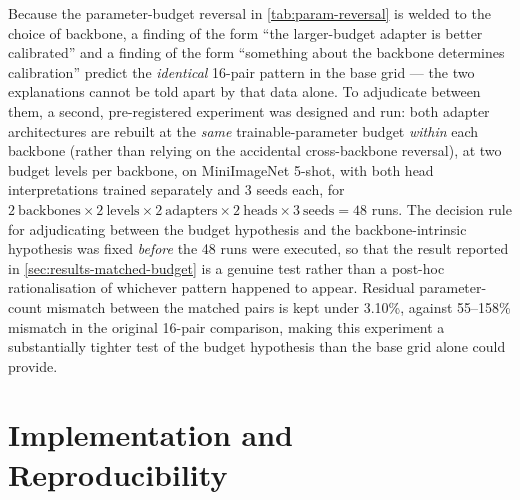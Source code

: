 \documentclass{iutbscthesis}
\begin{document}
Because the parameter-budget reversal in \autoref{tab:param-reversal} is welded to the choice of backbone, a finding of the form ``the larger-budget adapter is better calibrated'' and a finding of the form ``something about the backbone determines calibration'' predict the \emph{identical} 16-pair pattern in the base grid — the two explanations cannot be told apart by that data alone. To adjudicate between them, a second, pre-registered experiment was designed and run: both adapter architectures are rebuilt at the \emph{same} trainable-parameter budget \emph{within} each backbone (rather than relying on the accidental cross-backbone reversal), at two budget levels per backbone, on MiniImageNet 5-shot, with both head interpretations trained separately and 3 seeds each, for $2~\text{backbones} \times 2~\text{levels} \times 2~\text{adapters} \times 2~\text{heads} \times 3~\text{seeds} = 48$ runs. The decision rule for adjudicating between the budget hypothesis and the backbone-intrinsic hypothesis was fixed \emph{before} the 48 runs were executed, so that the result reported in \autoref{sec:results-matched-budget} is a genuine test rather than a post-hoc rationalisation of whichever pattern happened to appear. Residual parameter-count mismatch between the matched pairs is kept under 3.10\%, against 55--158\% mismatch in the original 16-pair comparison, making this experiment a substantially tighter test of the budget hypothesis than the base grid alone could provide.

\section{Implementation and Reproducibility}
\label{sec:method-implementation}
\end{document}
